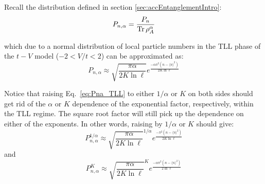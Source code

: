 Recall the distribution defined in section \ref{sec:accEntanglementIntro}:
%
\begin{equation}
P_{n,\alpha} = \frac{P_{n}}{\operatorname{Tr}\rho_{A}^{\alpha}}
\label{eq:Pna}
\end{equation}
 
which due to a normal distribution of local particle numbers  in the TLL phase of the $t-V$ model ($-2 < V/t < 2$) can be approximated as:
%
\begin{equation}
P_{n,\alpha} \approx \sqrt{\frac{\pi\alpha}{2K\ln{\ell}}} e^{\frac{-\alpha \pi^2 (n - \langle n \rangle^2 )}{2K\ln{\ell}}} 
\label{eq:Pna_TLL}
\end{equation}
 
Notice that raising Eq.~\eqref{eq:Pna_TLL} to either $1/\alpha$ or $K$ on both sides should get rid of the $\alpha$ or $K$ dependence of the exponential factor, respectively, within the TLL regime. The square root factor will still pick up the dependence on either of the exponents. In other words, raising by $1/\alpha$ or $K$ should give:
 \begin{equation}
 P_{n,\alpha}^{1/\alpha} \approx \sqrt{\frac{\pi\alpha}{2K\ln{\ell}}}^{1/\alpha} e^{\frac{- \pi^2 (n - \langle n \rangle^2 )}{2K\ln{\ell}}} 
 \label{eq:Pna_to_alphaInv}
 \end{equation}
 and
 \begin{equation}
 P_{n,\alpha}^{K} \approx \sqrt{\frac{\pi\alpha}{2K\ln{\ell}}}^K e^{\frac{- \alpha \pi^2 (n - \langle n \rangle^2 )}{2\ln{\ell}}} 
 \label{eq:Pna_to_K}
 \end{equation}
